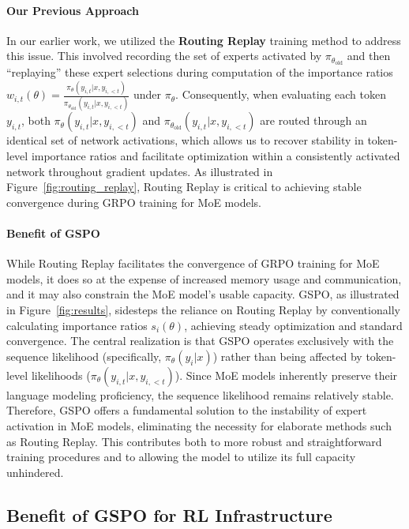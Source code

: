 \paragraph{Our Previous Approach} In our earlier work, we utilized the \textbf{Routing Replay} training method to address this issue. This involved recording the set of experts activated by $\pi_{\theta_\text{old}}$ and then “replaying” these expert selections during computation of the importance ratios $w_{i,t}(\theta) = \frac{ \pi_{\theta} (y_{i,t} | x, y_{i,<t}) }{ \pi_{\theta_\text{old}} (y_{i,t} | x, y_{i,<t})}$ under $\pi_{\theta}$. Consequently, when evaluating each token $y_{i,t}$, both $\pi_{\theta} (y_{i,t} | x, y_{i,<t})$ and $\pi_{\theta_\text{old}} (y_{i,t} | x, y_{i,<t})$ are routed through an identical set of network activations, which allows us to recover stability in token-level importance ratios and facilitate optimization within a consistently activated network throughout gradient updates. As illustrated in Figure~\ref{fig:routing_replay}, Routing Replay is critical to achieving stable convergence during GRPO training for MoE models.

\paragraph{Benefit of GSPO} While Routing Replay facilitates the convergence of GRPO training for MoE models, it does so at the expense of increased memory usage and communication, and it may also constrain the MoE model's usable capacity. GSPO, as illustrated in Figure~\ref{fig:results}, sidesteps the reliance on Routing Replay by conventionally calculating importance ratios $s_i(\theta)$, achieving steady optimization and standard convergence. The central realization is that GSPO operates exclusively with the sequence likelihood (specifically, $\pi_{\theta} (y_i | x)$) rather than being affected by token-level likelihoods ($\pi_{\theta} (y_{i,t} | x, y_{i,<t})$). Since MoE models inherently preserve their language modeling proficiency, the sequence likelihood remains relatively stable. Therefore, GSPO offers a fundamental solution to the instability of expert activation in MoE models, eliminating the necessity for elaborate methods such as Routing Replay. This contributes both to more robust and straightforward training procedures and to allowing the model to utilize its full capacity unhindered.

\subsection{Benefit of GSPO for RL Infrastructure}

